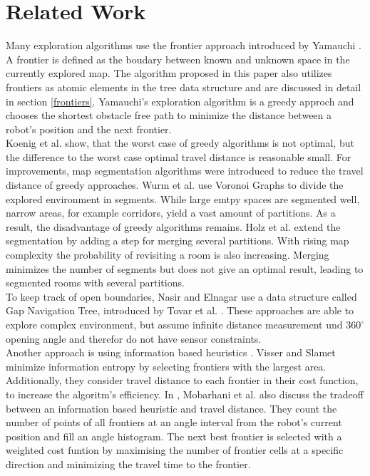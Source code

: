 \documentclass[twocolumn]{svjour3}[2016]
\begin{document}
\section{Related Work}
\label{related_work}
Many exploration algorithms use the frontier approach introduced by Yamauchi \cite{brian_yamauchi_frontier-based_2007}. A frontier is defined as the boudary between known and unknown space in the currently explored map. The algorithm proposed in this paper also utilizes frontiers as atomic elements in the tree data structure and are discussed in detail in section \ref{frontiers}. Yamauchi's exploration algorithm is a greedy approch and chooses the shortest obstacle free path to minimize the distance between a robot's position and the next frontier.\\
Koenig et al. \cite{sven_koenig_greedy_2001} show, that the worst case of greedy algorithms is not optimal, but the difference to the worst case optimal travel distance is reasonable small. For improvements, map segmentation algorithms were introduced \cite{dirk_holz_evaluating_2010, kai_m._wurm_coordinated_2008} to reduce the travel distance of greedy approaches. Wurm et al. \cite{kai_m._wurm_coordinated_2008} use Voronoi Graphs to divide the explored environment in segments. While large emtpy spaces are segmented well, narrow areas, for example corridors, yield a vast amount of partitions. As a result, the disadvantage of greedy algorithms remains. Holz et al. \cite{dirk_holz_evaluating_2010} extend the segmentation by adding a step for merging several partitions. With rising map complexity the probability of revisiting a room is also increasing. Merging minimizes the number of segments but does not give an optimal result, leading to segmented rooms with several partitions.\\
To keep track of open boundaries, Nasir and Elnagar \cite{reem_nasir_gap_2015} use a data structure called Gap Navigation Tree, introduced by Tovar et al. \cite{benjamin_tovar_optimal_2003}. These approaches are able to explore complex environment, but assume infinite distance measurement und $360^{\circ}$ opening angle and therefor do not have sensor constraints.\\
Another approach is using information based heuristics \cite{arnoud_visser_balancing_2008,amir_mobarhani_histogram_2011,robert_grabowski_autonomous_2003}. Visser and Slamet \cite{arnoud_visser_balancing_2008} minimize information entropy by selecting frontiers with the largest area. Additionally, they consider travel distance to each frontier in their cost function, to increase the algoritm's efficiency. In \cite{amir_mobarhani_histogram_2011}, Mobarhani et al. also discuss the tradeoff between an information based heuristic and travel distance. They count the number of points of all frontiers at an angle interval from the robot's current position and fill an angle histogram. The next best frontier is selected with a weighted cost funtion by maximising the number of frontier cells at a specific direction and minimizing the travel time to the frontier.\\
\end{document}
